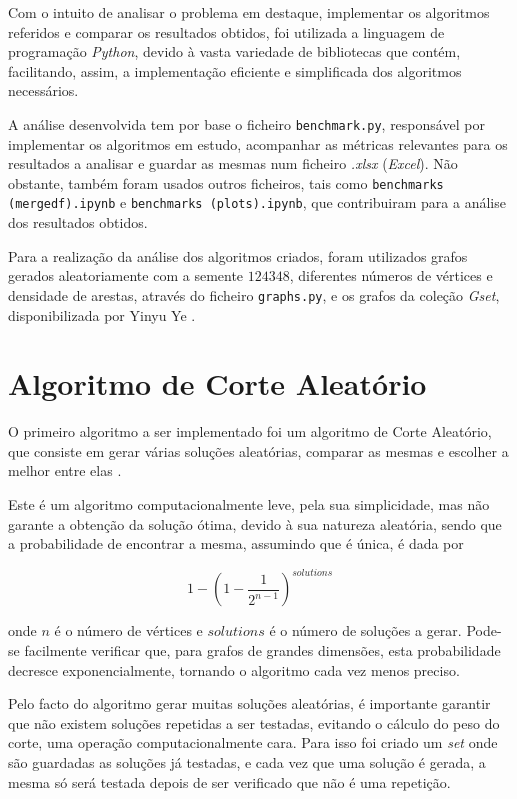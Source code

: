 \documentclass[mirror, portugues]{revdetua}
\begin{document}
Com o intuito de analisar o problema em destaque, implementar os algoritmos referidos e comparar os resultados obtidos, foi utilizada a linguagem de programação \textit{Python}, devido à vasta variedade de bibliotecas que contém, facilitando, assim, a implementação eficiente e simplificada dos algoritmos necessários.

A análise desenvolvida tem por base o ficheiro \texttt{benchmark.py}, responsável por implementar os algoritmos em estudo, acompanhar as métricas relevantes para os resultados a analisar e guardar as mesmas num ficheiro \textit{.xlsx} (\textit{Excel}). Não obstante, também foram usados outros ficheiros, tais como \texttt{benchmarks (mergedf).ipynb} e \texttt{benchmarks (plots).ipynb}, que contribuiram para a análise dos resultados obtidos.

Para a realização da análise dos algoritmos criados, foram utilizados grafos gerados aleatoriamente com a semente $124348$, diferentes números de vértices e densidade de arestas, através do ficheiro \texttt{graphs.py}, e os grafos da coleção \textit{Gset}, disponibilizada por Yinyu Ye \cite{GS24}.

\section{Algoritmo de Corte Aleatório}

O primeiro algoritmo a ser implementado foi um algoritmo de Corte Aleatório, que consiste em gerar várias soluções aleatórias, comparar as mesmas e escolher a melhor entre elas \cite{AG14}.

Este é um algoritmo computacionalmente leve, pela sua simplicidade, mas não garante a obtenção da solução ótima, devido à sua natureza aleatória, sendo que a probabilidade de encontrar a mesma, assumindo que é única, é dada por

$$1 - \left( 1 - \frac{1}{2^{n-1}} \right)^{solutions}$$

\noindent onde $n$ é o número de vértices e $solutions$ é o número de soluções a gerar. Pode-se facilmente verificar que, para grafos de grandes dimensões, esta probabilidade decresce exponencialmente, tornando o algoritmo cada vez menos preciso.

Pelo facto do algoritmo gerar muitas soluções aleatórias, é importante garantir que não existem soluções repetidas a ser testadas, evitando o cálculo do peso do corte, uma operação computacionalmente cara. Para isso foi criado um \textit{set} onde são guardadas as soluções já testadas, e cada vez que uma solução é gerada, a mesma só será testada depois de ser verificado que não é uma repetição.
\end{document}
